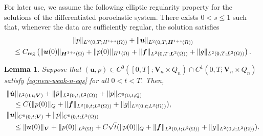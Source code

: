 \documentclass{amsart}
\newtheorem{lemma}[theorem]{Lemma}
\newcommand{\algn}[1]{\begin{align} #1 \end{align}}
\newcommand{\dive}{\operatorname{div}}
\begin{document}
For later use, we assume the following elliptic regularity property for the solutions of the differentiated poroelastic system. There exists \(0<s\le 1\) such that, whenever the data are sufficiently regular, the solution satisfies
\begin{multline}
    \label{eq:elliptic-regularity}
    \|p\|_{L^2(0,T;H^{1+s}(\Omega))}
 + \|\boldsymbol u\|_{L^2(0,T;\boldsymbol H^{1+s}(\Omega))}
    \\
    \le C_{\rm reg}
 \left(
 \|\boldsymbol u (0)\|_{\boldsymbol H^{1+s}(\Omega)}
 + \|p (0)\|_{H^1(\Omega)}
 + \|\boldsymbol f\|_{L^2(0,T;\boldsymbol L^2(\Omega))}
 + \|g\|_{L^2(0,T;L^2(\Omega))}
 \right).
\end{multline}
%
\begin{lemma}
	Suppose that $(\boldsymbol{u}, p) \in C^0([0,T]; \boldsymbol{V}_n \times Q_n) \cap C^1(0,T; \boldsymbol{V}_n \times Q_n)$ satisfy \eqref{eq:new-weak-n-eqs} for all $0< t <T$. Then, 
%
\algn{
	\label{eq:energy-estimate2}
	&\| \dot{\boldsymbol{u}} \|_{L^2(0,t; \boldsymbol{V})} + \|\dot{p}\|_{L^2(0,t; L^2(\Omega))} + \|p\|_{C^0(0,t; Q)} 
	\\
	\notag
	&\quad \le C (\|p(0)\|_{Q} + \|\boldsymbol{f}\|_{L^2(0,t; L^2(\Omega))} + \|g\|_{L^2(0,t;L^2(\Omega))}), 
	\\
	\label{eq:energy-estimate1}
	&\|{\boldsymbol{u}}\|_{C^0(0,t;\boldsymbol{V})} + \|{p}\|_{C^0(0,t;L^2(\Omega))} 
	\\
	\notag
	&\quad \le \|\boldsymbol{u}(0)\|_{\boldsymbol{V}} + \|p(0)\|_{L^2(\Omega)} + C\sqrt{t} (\|p(0)\|_{Q} + \|\boldsymbol{f}\|_{L^2(0,t; L^2(\Omega))} + \|g\|_{L^2(0,t;L^2(\Omega))} ) .	
}
%
\end{lemma}
\end{document}
